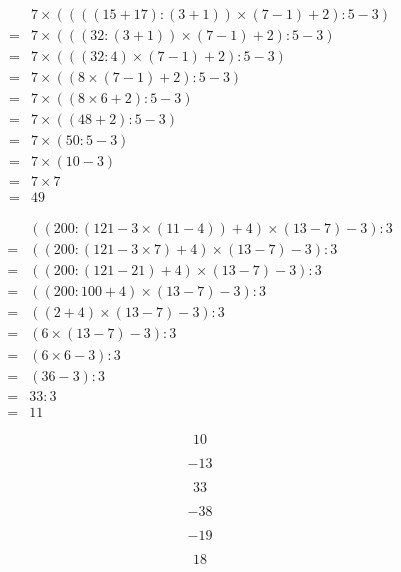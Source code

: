 \begin{multicols}{2}
  \begin{align*}
    &7\times ((((15+17):(3+1))\times (7-1)+2):5-3)\\
    =&7\times (((32:(3+1))\times (7-1)+2):5-3)\\
    =&7\times (((32:4)\times (7-1)+2):5-3)\\
    =&7\times ((8\times (7-1)+2):5-3)\\
    =&7\times ((8\times 6+2):5-3)\\
    =&7\times ((48+2):5-3)\\
    =&7\times (50:5-3)\\
    =&7\times (10-3)\\
    =&7\times 7\\
    =&49
  \end{align*}

  \begin{align*}
    &((200:(121-3\times (11-4))+4)\times (13-7)-3):3\\
    =&((200:(121-3\times 7)+4)\times (13-7)-3):3\\
    =&((200:(121-21)+4)\times (13-7)-3):3\\
    =&((200:100+4)\times (13-7)-3):3\\
    =&((2+4)\times (13-7)-3):3\\
    =&(6\times (13-7)-3):3\\
    =&(6\times 6-3):3\\
    =&(36-3):3\\
    =&33:3\\
    =&11
  \end{align*}
\end{multicols}

\begin{multicols}{3}
    $$10$$
      
    $$-13$$
      
    $$33$$
     
\end{multicols}

\begin{multicols}{3}
    $$-38$$
      
    $$-19$$
      
    $$18$$
\end{multicols}


